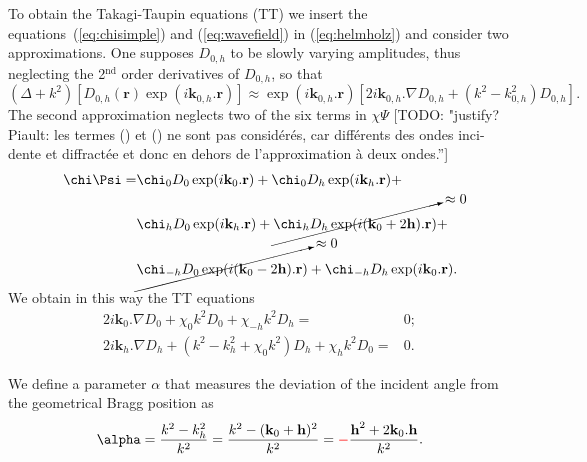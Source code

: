 \documentclass[preprint]{iucr}              %
\newcommand{\todo}[1]{{\color{red}[TODO: "#1'']}}
\newcommand{\inred}[1]{{\color{red}#1}}
\begin{document}
To obtain the Takagi-Taupin equations (TT) we insert the equations~(\ref{eq:chisimple}) and (\ref{eq:wavefield}) in (\ref{eq:helmholz}) and consider two approximations. One supposes $D_{0,h}$ to be slowly varying amplitudes, thus neglecting the 2$^{\text{nd}}$ order derivatives of $D_{0,h}$,  so that
\begin{equation}
\label{eq:approxslowlyvarying}
(\Delta + k^2)[D_{0,h}(\textbf{r}) \exp(i\textbf{k}_{0,h} . \textbf{r})] \approx \exp(i\textbf{k}_{0,h} . \textbf{r}) [2 i \textbf{k}_{0,h} . \nabla D_{0,h} + (k^2 - k^2_{0,h}) D_{0,h}].
\end{equation}
The second approximation neglects two of the six terms in $\chi \Psi$ \todo{justify? Piault: les termes ()
et () ne sont pas considérés, car différents des ondes inci-
dente et diffractée et donc en dehors de l’approximation à deux ondes.}
\begin{subequations}
\label{eq:approxchiPsi}
\begin{align}
\chi\Psi =&
\chi_0 D_0 \exp(i \textbf{k}_0 . \textbf{r}) +
\chi_0 D_h \exp(i \textbf{k}_h . \textbf{r}) +\\
&\chi_h D_0 \exp(i \textbf{k}_h . \textbf{r}) +
\cancelto{\approx 0}{\chi_h D_h \exp(i (\textbf{k}_0+2\textbf{h}) . \textbf{r})} +\\
&\cancelto{\approx 0}{\chi_{-h} D_0 \exp(i (\textbf{k}_0 - 2 \textbf{h}) .\textbf{r})} +
\chi_{-h} D_h \exp(i \textbf{k}_0 . \textbf{r}) .
\end{align}
\end{subequations}
We obtain in this way the TT equations 
\begin{subequations}
\label{eq:TTvector}
\begin{align}
2 i \textbf{k}_0 . \nabla D_0 + \chi_0 k^2 D_0 + \chi_{-h} k^2 D_h =& 0; \\
2 i \textbf{k}_h . \nabla D_h + (k^2 - k_h^2 + \chi_0 k^2) D_h + \chi_{h} k^2 D_0 =& 0.
\end{align}
\end{subequations}

We define a parameter $\alpha$ that measures the deviation of the incident angle from the geometrical Bragg position as
\begin{equation}
\label{eq:alpha}
\alpha = \frac{k^2-k_h^2}{k^2} = \frac{k^2-(\textbf k_0 + \textbf h)^2}{k^2} = \inred{-} \frac{\textbf h^2 + 2 \textbf k_0 . \textbf h}{k^2}.
\end{equation}
\end{document}
